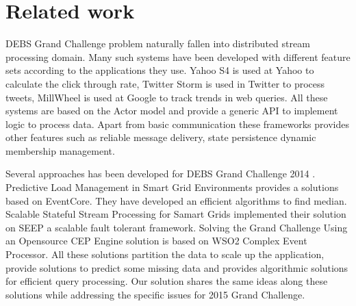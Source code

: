 \section{Related work}
DEBS Grand Challenge problem naturally fallen into distributed stream processing domain. Many such systems have been developed with different feature sets according to the applications they use. Yahoo S4 \cite{neumeyer2010s4} is used at Yahoo to calculate the click through rate, Twitter Storm \cite{toshniwal2014storm} is used in Twitter to process tweets, MillWheel \cite{akidau2013millwheel} is used at Google to track trends in web queries. All these systems are based on the Actor model \cite{agha1985actors} and provide a generic API to implement logic to process data. Apart from basic communication these frameworks provides other features such as reliable message delivery, state persistence dynamic membership management. 

Several approaches has been developed for DEBS Grand Challenge 2014 \cite{jerzak2014debs}. Predictive Load Management in Smart Grid Environments \cite{mutschler2014predictive} provides a solutions based on EventCore. They have developed an efficient algorithms to find median. Scalable Stateful Stream Processing for Samart Grids \cite{fernandez2014scalable} implemented their solution on SEEP \cite{castro2013integrating} a scalable fault tolerant framework. Solving the Grand Challenge Using an Opensource CEP Engine \cite{perera2014solving} solution is based on WSO2 Complex Event Processor. All these solutions partition the data to scale up the application, provide solutions to predict some missing data and provides algorithmic solutions for efficient query processing. Our solution shares the same ideas along these solutions while addressing the specific issues for 2015 Grand Challenge.
